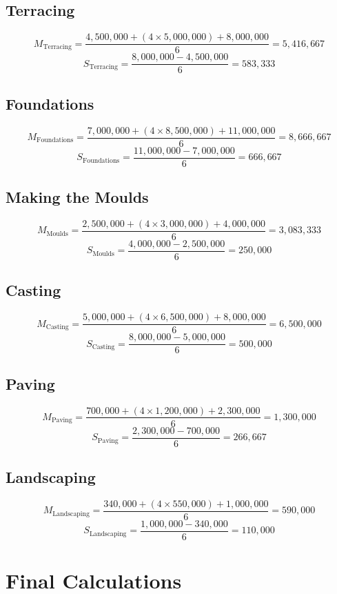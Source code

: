 \documentclass{article}
\begin{document}
\subsection{Terracing}
\[
M_{\text{Terracing}} = \frac{4,500,000 + (4 \times 5,000,000) + 8,000,000}{6} = 5,416,667
\]
\[
S_{\text{Terracing}} = \frac{8,000,000 - 4,500,000}{6} = 583,333
\]

\subsection{Foundations}
\[
M_{\text{Foundations}} = \frac{7,000,000 + (4 \times 8,500,000) + 11,000,000}{6} = 8,666,667
\]
\[
S_{\text{Foundations}} = \frac{11,000,000 - 7,000,000}{6} = 666,667
\]

\subsection{Making the Moulds}
\[
M_{\text{Moulds}} = \frac{2,500,000 + (4 \times 3,000,000) + 4,000,000}{6} = 3,083,333
\]
\[
S_{\text{Moulds}} = \frac{4,000,000 - 2,500,000}{6} = 250,000
\]

\subsection{Casting}
\[
M_{\text{Casting}} = \frac{5,000,000 + (4 \times 6,500,000) + 8,000,000}{6} = 6,500,000
\]
\[
S_{\text{Casting}} = \frac{8,000,000 - 5,000,000}{6} = 500,000
\]

\subsection{Paving}
\[
M_{\text{Paving}} = \frac{700,000 + (4 \times 1,200,000) + 2,300,000}{6} = 1,300,000
\]
\[
S_{\text{Paving}} = \frac{2,300,000 - 700,000}{6} = 266,667
\]

\subsection{Landscaping}
\[
M_{\text{Landscaping}} = \frac{340,000 + (4 \times 550,000) + 1,000,000}{6} = 590,000
\]
\[
S_{\text{Landscaping}} = \frac{1,000,000 - 340,000}{6} = 110,000
\]

\section*{Final Calculations}
\end{document}
